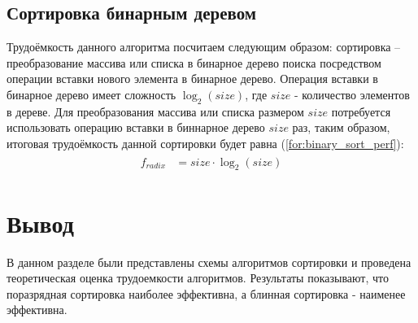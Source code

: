 \subsection{Сортировка бинарным деревом}
Трудоёмкость данного алгоритма посчитаем следующим образом: сортировка -- преобразование массива или списка в бинарное дерево поиска посредством операции вставки нового элемента в бинарное дерево.
Операция вставки в бинарное дерево имеет сложность $ \log_{2}(size)$, где $size$ - количество элементов в дереве.
Для преобразования массива или списка размером $size$ потребуется использовать операцию вставки в биннарное дерево $size$ раз, таким образом, итоговая трудоёмкость данной сортировки будет равна (\ref{for:binary_sort_perf}):
\begin{align}
\begin{split}
	\label{for:binary_sort_perf}
	f_{radix} &= size \cdot \log_{2}(size)
\end{split}
\end{align}

\section*{Вывод}
В данном разделе были представлены схемы алгоритмов сортировки и проведена теоретическая оценка трудоемкости алгоритмов. 
Результаты показывают, что поразрядная сортировка наиболее эффективна, а блинная сортировка - наименее эффективна.